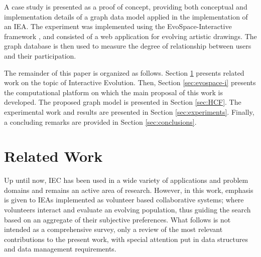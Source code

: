 \documentclass[conference]{IEEEtran}
\begin{document}
 
A case study is presented as a proof of concept, providing both
conceptual and implementation details of a graph data model applied in the 
implementation of an IEA. The experiment was implemented using
the EvoSpace-Interactive framework \cite{garcia2013evospace}, and consisted of a web application
for evolving artistic drawings. The graph database is then used to
measure the degree of relationship between users and their participation.  

The remainder of this paper is organized as follows.
Section \ref{sec:interactive} presents related work on the topic 
of Interactive Evolution.
Then, Section \ref{sec:evospace-i} presents the computational platform on which 
the main proposal of this work is developed. The proposed graph model is 
presented in Section \ref{sec:HCF}.
The experimental work and results are presented in Section \ref{sec:experiments}.
Finally, a concluding remarks are provided in Section \ref{sec:conclusions}.


\section{Related Work}
\label{sec:interactive}

Up until now, IEC  has been used in a wide variety of applications and problem domains
and remains an active area of research. However, in this work, emphasis is given to IEAs 
implemented as volunteer based collaborative systems; where volunteers interact and evaluate 
an evolving population, thus guiding the search based on an aggregate of their subjective 
preferences. What follows is not intended as a comprehensive survey, only a review of 
the most relevant contributions to the present work, with special attention put in
data structures and data management requirements.
\end{document}
